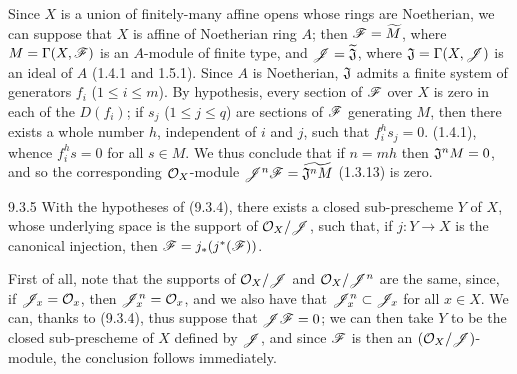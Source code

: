 \documentclass[../main.tex]{subfiles}
\begin{document}
Since $X$ is a union of finitely-many affine opens whose rings are Noetherian, we can suppose that $X$ is affine of Noetherian ring $A$; then $\mathscr{F}=\widetilde{M}$, where $M=\Gamma(X,\mathscr{F})$ is an $A$-module of finite type, and $\mathscr{J}=\widetilde{\mathfrak{J}}$, where $\mathfrak{J}=\Gamma(X,\mathscr{J})$ is an ideal of $A$ (1.4.1 and 1.5.1).
Since $A$ is Noetherian, $\mathfrak{J}$ admits a finite system of generators $f_i$ ($1\leqslant i\leqslant m$).
By hypothesis, every section of $\mathscr{F}$ over $X$ is zero in each of the $D(f_i)$; if $s_j$ ($1\leqslant j\leqslant q$) are sections of $\mathscr{F}$ generating $M$, then there exists a whole number $h$, independent of $i$ and $j$, such that $f_i^h s_j=0$. (1.4.1), whence $f_i^h s=0$ for all $s\in M$.
We thus conclude that if $n=mh$ then $\mathfrak{J}^n M=0$, and so the corresponding $\mathcal{O}_X$-module $\mathscr{J}^n\mathscr{F}=\widetilde{\mathfrak{J}^nM}$ (1.3.13) is zero.

\begin{cx}[Corollary]{9.3.5}
    With the hypotheses of {\normalfont(9.3.4)}, there exists a closed sub-prescheme $Y$ of $X$, whose underlying space is the support of $\mathcal{O}_X/\mathscr{J}$, such that, if $j\colon Y\to X$ is the canonical injection, then $\mathscr{F}=j_*(j^*(\mathscr{F}))$.
\end{cx}

First of all, note that the supports of $\mathcal{O}_X/\mathscr{J}$ and $\mathcal{O}_X/\mathscr{J}^n$ are the same, since, if $\mathscr{J}_x=\mathcal{O}_x$, then $\mathscr{J}_x^n=\mathcal{O}_x$, and we also have that $\mathscr{J}_x^n\subset\mathscr{J}_x$ for all $x\in X$.
We can, thanks to (9.3.4), thus suppose that $\mathscr{J}\mathscr{F}=0$; we can then take $Y$ to be the closed sub-prescheme of $X$ defined by $\mathscr{J}$, and since $\mathscr{F}$ is then an $(\mathcal{O}_X/\mathscr{J})$-module, the conclusion follows immediately.
\end{document}
